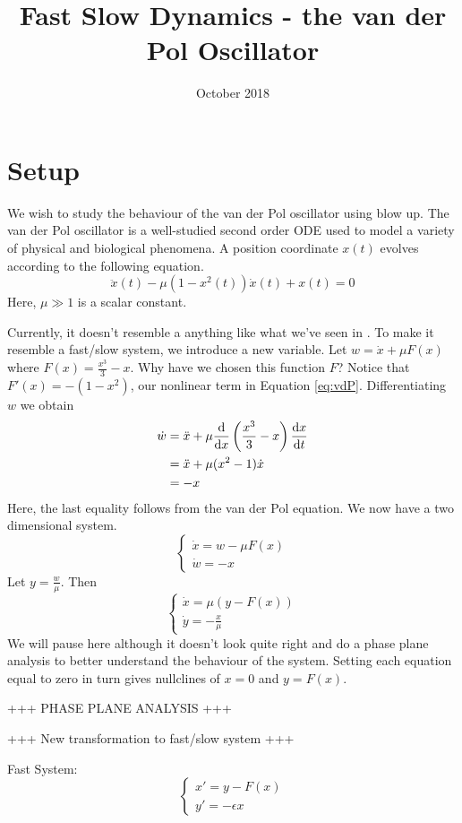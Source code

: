 \documentclass{article}
\title{Fast Slow Dynamics - the van der Pol Oscillator}
\author{}
\date{October 2018}
\begin{document}
\maketitle

\section{Setup}
We wish to study the behaviour of the van der Pol oscillator using blow up. The van der Pol oscillator is a well-studied second order ODE used to model a variety of physical and biological phenomena. A position coordinate \(x(t)\) evolves according to the following equation. 
\begin{equation} \label{eq:vdP}\ddot{x}(t)-\mu\left(1-x^2(t)\right)\dot{x}(t)+x(t)=0   \end{equation}
Here, \(\mu \gg 1\) is a scalar constant. \par 

Currently, it doesn't resemble a anything like what we've seen in \cite{krupa2001}. To make it resemble a fast/slow system, we introduce a new variable. Let \(w=\dot{x}+\mu F(x)\) where \(F(x)=\frac{x^3}{3}-x\). Why have we chosen this function \(F\)? Notice that \(F'(x)=-(1-x^2)\), our nonlinear term in Equation \ref{eq:vdP}. Differentiating \(w\) we obtain
\begin{align*}
    \dot{w}&=\ddot{x}+\mu\od{}{x}\left(\frac{x^3}{3}-x\right)\od{x}{t}\\
    & =\ddot{x}+\mu(x^2-1)\dot{x}\\
    &= -x
\end{align*}
Here, the last equality follows from the van der Pol equation. We now have a two dimensional system.
\[\begin{cases} \dot{x}=w-\mu F(x)\\
 \dot{w}=-x\end{cases}\]
 Let \(y=\frac{w}{\mu}\). Then
 \[\begin{cases} \dot{x}=\mu\left(y-F(x)\right)\\
 \dot{y}=-\frac{x}{\mu}\end{cases}\]
We will pause here although it doesn't look quite right and do a phase plane analysis to better understand the behaviour of the system. Setting each equation equal to zero in turn gives nullclines of \(x=0\) and \(y=F(x)\). 

+++ PHASE PLANE ANALYSIS +++

+++ New transformation to fast/slow system +++


Fast System:
\begin{equation}\label{fastsystem}
    \begin{cases} x'=y-F(x)\\
    y'=-\epsilon x
    \end{cases}
\end{equation}
\end{document}
